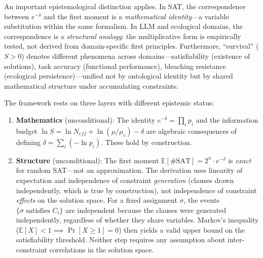 \documentclass[11pt,a4paper]{article}
\begin{document}
An important epistemological distinction applies. In SAT, the correspondence between $e^{-\delta}$ and the first moment is a \emph{mathematical identity}---a variable substitution within the same formalism. In LLM and ecological domains, the correspondence is a \emph{structural analogy}: the multiplicative form is empirically tested, not derived from domain-specific first principles. Furthermore, ``survival'' ($S > 0$) denotes different phenomena across domains---satisfiability (existence of solutions), task accuracy (functional performance), bleaching resistance (ecological persistence)---unified not by ontological identity but by shared mathematical structure under accumulating constraints.

The framework rests on three layers with different epistemic status:

\begin{enumerate}
    \item \textbf{Mathematics} (unconditional): The identity $e^{-\delta} = \prod_i p_i$ and the information budget $\ln S = \ln N_{eff} + \ln(\mu/\mu_c) - \delta$ are algebraic consequences of defining $\delta = \sum_i (-\ln p_i)$. These hold by construction.

    \item \textbf{Structure} (unconditional): The first moment $\mathbb{E}[\#\text{SAT}] = 2^n \cdot e^{-\delta}$ is \emph{exact} for random SAT---not an approximation. The derivation uses linearity of expectation and independence of constraint \emph{generation} (clauses drawn independently, which is true by construction), not independence of constraint \emph{effects} on the solution space. For a fixed assignment $\sigma$, the events $\{\sigma \text{ satisfies } C_i\}$ are independent because the clauses were generated independently, regardless of whether they share variables. Markov's inequality ($\mathbb{E}[X] < 1 \implies \Pr[X \geq 1] = 0$) then yields a valid upper bound on the satisfiability threshold. Neither step requires any assumption about inter-constraint correlations in the solution space.


\end{enumerate}
\end{document}
